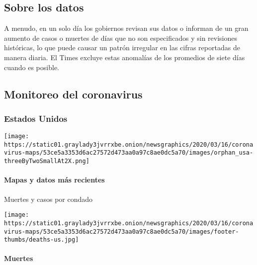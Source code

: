\hypertarget{sobre-los-datos}{%
\subsection{Sobre los datos}\label{sobre-los-datos}}

A menudo, en un solo día los gobiernos revisan sus datos o informan de
un gran aumento de casos o muertes de días que no son especificados y
sin revisiones históricas, lo que puede causar un patrón irregular en
las cifras reportadas de manera diaria. El Times excluye estas anomalías
de los promedios de siete días cuando es posible.

\hypertarget{monitoreo-del-coronavirus}{%
\subsection{Monitoreo del coronavirus}\label{monitoreo-del-coronavirus}}

\hypertarget{estados-unidos}{%
\subsubsection{Estados Unidos}\label{estados-unidos}}

\href{https://www.nytimes3xbfgragh.onion/interactive/2020/us/coronavirus-us-cases.html}{}

\texttt{[image: https://static01.graylady3jvrrxbe.onion/newsgraphics/2020/03/16/coronavirus-maps/53ce5a3353d6ac27572d473aa0a97c8ae0dc5a70/images/orphan\_usa-threeByTwoSmallAt2X.png]}

\hypertarget{mapas-y-datos-muxe1s-recientes}{%
\paragraph{Mapas y datos más
recientes}\label{mapas-y-datos-muxe1s-recientes}}

Muertes y casos por condado

\href{https://www.nytimes3xbfgragh.onion/interactive/2020/05/05/us/coronavirus-death-toll-us.html}{}

\texttt{[image: https://static01.graylady3jvrrxbe.onion/newsgraphics/2020/03/16/coronavirus-maps/53ce5a3353d6ac27572d473aa0a97c8ae0dc5a70/images/footer-thumbs/deaths-us.jpg]}

\hypertarget{muertes}{%
\paragraph{Muertes}\label{muertes}}

